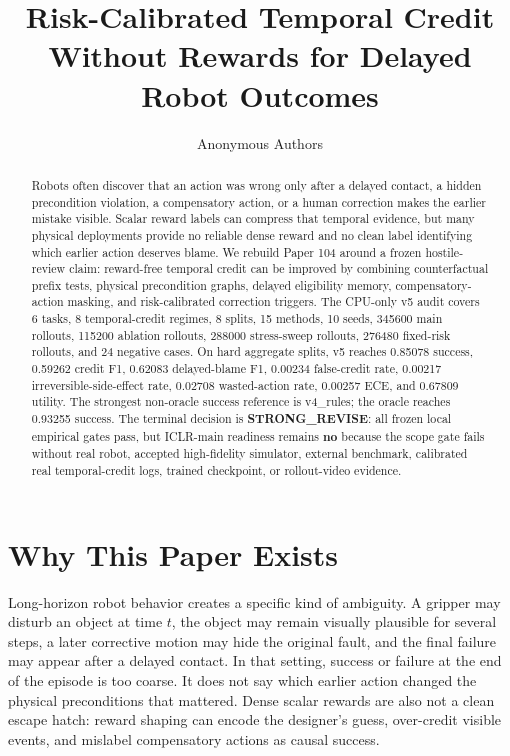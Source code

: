\documentclass{article}
\title{Risk-Calibrated Temporal Credit Without Rewards for Delayed Robot Outcomes}
\author{Anonymous Authors}
\begin{document}
\raggedbottom
\maketitle

\begin{abstract}
Robots often discover that an action was wrong only after a delayed contact, a hidden precondition violation, a compensatory action, or a human correction makes the earlier mistake visible. Scalar reward labels can compress that temporal evidence, but many physical deployments provide no reliable dense reward and no clean label identifying which earlier action deserves blame. We rebuild Paper 104 around a frozen hostile-review claim: reward-free temporal credit can be improved by combining counterfactual prefix tests, physical precondition graphs, delayed eligibility memory, compensatory-action masking, and risk-calibrated correction triggers. The CPU-only v5 audit covers 6 tasks, 8 temporal-credit regimes, 8 splits, 15 methods, 10 seeds, 345600 main rollouts, 115200 ablation rollouts, 288000 stress-sweep rollouts, 276480 fixed-risk rollouts, and 24 negative cases. On hard aggregate splits, v5 reaches 0.85078 success, 0.59262 credit F1, 0.62083 delayed-blame F1, 0.00234 false-credit rate, 0.00217 irreversible-side-effect rate, 0.02708 wasted-action rate, 0.00257 ECE, and 0.67809 utility. The strongest non-oracle success reference is v4\_rules; the oracle reaches 0.93255 success. The terminal decision is \textbf{STRONG\_REVISE}: all frozen local empirical gates pass, but ICLR-main readiness remains \textbf{no} because the scope gate fails without real robot, accepted high-fidelity simulator, external benchmark, calibrated real temporal-credit logs, trained checkpoint, or rollout-video evidence.
\end{abstract}

\section{Why This Paper Exists}
Long-horizon robot behavior creates a specific kind of ambiguity. A gripper may disturb an object at time $t$, the object may remain visually plausible for several steps, a later corrective motion may hide the original fault, and the final failure may appear after a delayed contact. In that setting, success or failure at the end of the episode is too coarse. It does not say which earlier action changed the physical preconditions that mattered. Dense scalar rewards are also not a clean escape hatch: reward shaping can encode the designer's guess, over-credit visible events, and mislabel compensatory actions as causal success.
\end{document}
